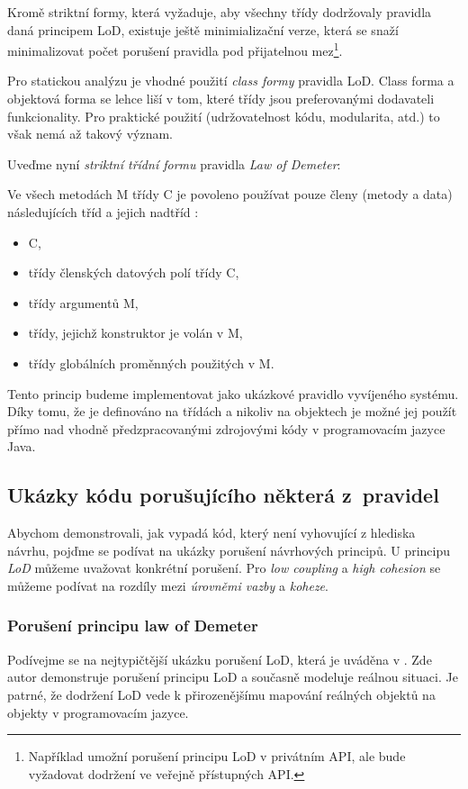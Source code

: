 Kromě striktní formy, která vyžaduje, aby všechny třídy dodržovaly pravidla daná principem LoD, existuje ještě minimializační verze, která se snaží minimalizovat počet porušení pravidla pod přijatelnou mez\footnote{Například umožní porušení principu LoD v privátním API, ale bude vyžadovat dodržení ve veřejně přístupných API.}.

Pro statickou analýzu je vhodné použití \emph{class formy} pravidla LoD. Class forma a objektová forma se lehce liší v tom, které třídy jsou preferovanými dodavateli funkcionality. Pro praktické použití (udržovatelnost kódu, modularita, atd.) to však nemá až takový význam.

Uveďme nyní \emph{striktní třídní formu} pravidla \emph{Law of Demeter}:

\begin{designprinciple}
  Ve všech metodách M třídy C je povoleno používat pouze členy (metody a data) následujících tříd a jejich nadtříd \cite{35588}:
  \begin{itemize}
  \item C,
  \item třídy členských datových polí třídy C,
  \item třídy argumentů M,
  \item třídy, jejichž konstruktor je volán v M,
  \item třídy globálních proměnných použitých v M.
  \end{itemize}
\end{designprinciple}

Tento princip budeme implementovat jako ukázkové pravidlo vyvíjeného systému. Díky tomu, že je definováno na třídách a nikoliv na objektech je možné jej použít přímo nad vhodně předzpracovanými zdrojovými kódy v programovacím jazyce Java.

\subsection{Ukázky kódu porušujícího některá z~pravidel}
Abychom demonstrovali, jak vypadá kód, který není vyhovující z hlediska návrhu, pojďme se podívat na ukázky porušení návrhových principů. U principu \emph{LoD} můžeme uvažovat konkrétní porušení. Pro \emph{low coupling} a \emph{high cohesion} se můžeme podívat na rozdíly mezi \emph{úrovněmi vazby} a \emph{koheze}.

\subsubsection{Porušení principu law of Demeter}
Podívejme se na nejtypičtější ukázku porušení LoD, která je uváděna v \cite{lod:paperboy}. Zde autor demonstruje porušení principu LoD a současně modeluje reálnou situaci. Je patrné, že dodržení LoD vede k přirozenějšímu mapování reálných objektů na objekty v programovacím jazyce.

